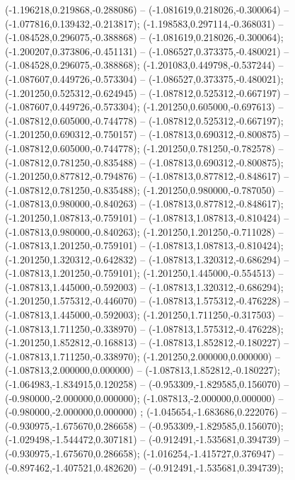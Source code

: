  (-1.196218,0.219868,-0.288086) -- (-1.081619,0.218026,-0.300064) -- (-1.077816,0.139432,-0.213817);
 (-1.198583,0.297114,-0.368031) -- (-1.084528,0.296075,-0.388868) -- (-1.081619,0.218026,-0.300064);
 (-1.200207,0.373806,-0.451131) -- (-1.086527,0.373375,-0.480021) -- (-1.084528,0.296075,-0.388868);
 (-1.201083,0.449798,-0.537244) -- (-1.087607,0.449726,-0.573304) -- (-1.086527,0.373375,-0.480021);
 (-1.201250,0.525312,-0.624945) -- (-1.087812,0.525312,-0.667197) -- (-1.087607,0.449726,-0.573304);
 (-1.201250,0.605000,-0.697613) -- (-1.087812,0.605000,-0.744778) -- (-1.087812,0.525312,-0.667197);
 (-1.201250,0.690312,-0.750157) -- (-1.087813,0.690312,-0.800875) -- (-1.087812,0.605000,-0.744778);
 (-1.201250,0.781250,-0.782578) -- (-1.087812,0.781250,-0.835488) -- (-1.087813,0.690312,-0.800875);
 (-1.201250,0.877812,-0.794876) -- (-1.087813,0.877812,-0.848617) -- (-1.087812,0.781250,-0.835488);
 (-1.201250,0.980000,-0.787050) -- (-1.087813,0.980000,-0.840263) -- (-1.087813,0.877812,-0.848617);
 (-1.201250,1.087813,-0.759101) -- (-1.087813,1.087813,-0.810424) -- (-1.087813,0.980000,-0.840263);
 (-1.201250,1.201250,-0.711028) -- (-1.087813,1.201250,-0.759101) -- (-1.087813,1.087813,-0.810424);
 (-1.201250,1.320312,-0.642832) -- (-1.087813,1.320312,-0.686294) -- (-1.087813,1.201250,-0.759101);
 (-1.201250,1.445000,-0.554513) -- (-1.087813,1.445000,-0.592003) -- (-1.087813,1.320312,-0.686294);
 (-1.201250,1.575312,-0.446070) -- (-1.087813,1.575312,-0.476228) -- (-1.087813,1.445000,-0.592003);
 (-1.201250,1.711250,-0.317503) -- (-1.087813,1.711250,-0.338970) -- (-1.087813,1.575312,-0.476228);
 (-1.201250,1.852812,-0.168813) -- (-1.087813,1.852812,-0.180227) -- (-1.087813,1.711250,-0.338970);
 (-1.201250,2.000000,0.000000) -- (-1.087813,2.000000,0.000000) -- (-1.087813,1.852812,-0.180227);
 (-1.064983,-1.834915,0.120258) -- (-0.953309,-1.829585,0.156070) -- (-0.980000,-2.000000,0.000000);
 (-1.087813,-2.000000,0.000000) -- (-0.980000,-2.000000,0.000000) ;
 (-1.045654,-1.683686,0.222076) -- (-0.930975,-1.675670,0.286658) -- (-0.953309,-1.829585,0.156070);
 (-1.029498,-1.544472,0.307181) -- (-0.912491,-1.535681,0.394739) -- (-0.930975,-1.675670,0.286658);
 (-1.016254,-1.415727,0.376947) -- (-0.897462,-1.407521,0.482620) -- (-0.912491,-1.535681,0.394739);
